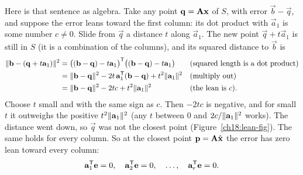 Here is that sentence as algebra. Take any point $\mathbf{q}=\mathbf{A}\mathbf{x}$ of $S$, with error
$\vec{b}-\vec{q}$, and suppose the error leans toward the first column: its dot product with
$\vec{a}_1$ is some number $c\neq 0$. Slide from $\vec{q}$ a distance $t$ along $\vec{a}_1$. The
new point $\vec{q}+t\vec{a}_1$ is still in $S$ (it is a combination of the columns), and its
squared distance to $\vec{b}$ is
\begin{align*}
  \lVert\mathbf{b}-(\mathbf{q}+t\mathbf{a}_1)\rVert^2
    &= \bigl((\mathbf{b}-\mathbf{q})-t\mathbf{a}_1\bigr)^{\mathsf{T}}\bigl((\mathbf{b}-\mathbf{q})-t\mathbf{a}_1\bigr)
      && \text{(squared length is a dot product)}\\
    &= \lVert\mathbf{b}-\mathbf{q}\rVert^2 - 2t\,\mathbf{a}_1^{\mathsf{T}}(\mathbf{b}-\mathbf{q}) + t^2\lVert\mathbf{a}_1\rVert^2
      && \text{(multiply out)}\\
    &= \lVert\mathbf{b}-\mathbf{q}\rVert^2 - 2tc + t^2\lVert\mathbf{a}_1\rVert^2
      && \text{(the lean is $c$).}
\end{align*}
Choose $t$ small and with the same sign as $c$. Then $-2tc$ is negative, and for small $t$ it
outweighs the positive $t^2\lVert\mathbf{a}_1\rVert^2$ (any $t$ between $0$ and $2c/\lVert\mathbf{a}_1\rVert^2$
works). The distance went down, so $\vec{q}$ was not the closest point
(Figure~\ref{ch18:lean-fig}). The same holds for every column. So at the closest point
$\mathbf{p}=\mathbf{A}\hat{\mathbf{x}}$ the error has zero lean toward every column:
\[
  \mathbf{a}_1^{\mathsf{T}}\mathbf{e}=0,\quad \mathbf{a}_2^{\mathsf{T}}\mathbf{e}=0,\quad\dots,\quad \mathbf{a}_r^{\mathsf{T}}\mathbf{e}=0.
\]

